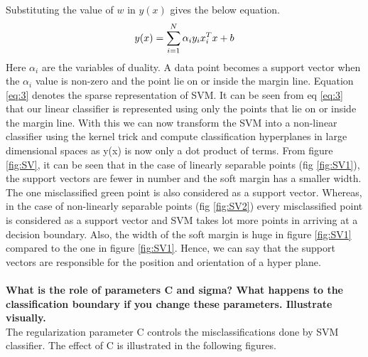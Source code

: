 {	Substituting the value of $w$ in $y(x)$ gives the below equation.
	 \begin{equation}\label{eq:3}
	\centering
	y(x)=\sum_{i=1}^{N} \alpha_i y_i x_i^T x+b
	\end{equation}
	Here $\alpha_i$ are the variables of duality. A data point becomes a support vector when the $\alpha_i$ value is non-zero and the point lie on or inside the margin line. Equation \ref{eq:3} denotes the sparse representation of SVM.
	It can be seen from eq \ref{eq:3} that our linear classifier is represented using only the points that lie on or inside the margin line. With this we can now  transform the  SVM into a non-linear classifier using the kernel trick and compute classification hyperplanes in large dimensional spaces as y(x) is now only a dot product of terms.  From figure \ref{fig:SV}, it can be seen that in the case of linearly separable points (fig \ref{fig:SV1}), the support vectors are fewer in number and the soft margin has a smaller width. The one misclassified green point is also considered as a support vector. Whereas, in the case of non-linearly separable points (fig \ref{fig:SV2}) every misclassified point is considered as a support vector and SVM takes lot more points in arriving at a decision boundary. Also, the width of the soft margin is huge in figure \ref{fig:SV1} compared to the one in figure \ref{fig:SV1}. Hence, we can say that the support vectors are responsible for the position and orientation of a hyper plane.\\\\
\textbf{What is the role of parameters C and sigma? What happens to the classification boundary if you change these parameters. Illustrate visually.}\\
The regularization parameter C controls the misclassifications done by SVM classifier. The effect of C is illustrated in the following figures.


}
